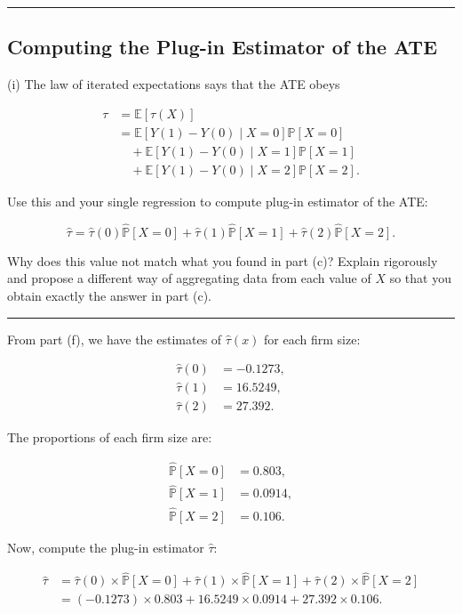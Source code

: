 \documentclass{article}
\newenvironment{colorparagraph}[1]{\par\color{#1}}{\par}
\begin{document}
\begin{colorparagraph}{questioncolor}
\rule{\textwidth}{0.5pt}

\label{q3i}\subsection{Computing the Plug-in Estimator of the ATE}
(i) The law of iterated expectations says that the ATE obeys

\begin{align*}
    \tau &= \mathbb{E}[\tau(X)] \\
    & = \mathbb{E}[Y(1) - Y(0) \mid X = 0]\mathbb{P}[X = 0] \\
    &\quad + \mathbb{E}[Y(1) - Y(0) \mid X = 1]\mathbb{P}[X = 1] \\
    &\quad + \mathbb{E}[Y(1) - Y(0) \mid X = 2]\mathbb{P}[X = 2].
\end{align*}

Use this and your single regression to compute plug-in estimator of the ATE:

\[
\hat{\tau} = \hat{\tau}(0)\hat{\mathbb{P}}[X = 0] + \hat{\tau}(1)\hat{\mathbb{P}}[X = 1] + \hat{\tau}(2)\hat{\mathbb{P}}[X = 2].
\]

Why does this value not match what you found in part (c)? Explain rigorously and propose a different way of aggregating data from each value of \( X \) so that you obtain exactly the answer in part (c).

\rule{\textwidth}{0.5pt}
\end{colorparagraph}

From part (f), we have the estimates of \(\hat{\tau}(x)\) for each firm size:

\[
\begin{aligned}
\hat{\tau}(0) &= -0.1273, \\
\hat{\tau}(1) &= 16.5249, \\
\hat{\tau}(2) &= 27.392.
\end{aligned}
\]

The proportions of each firm size are:

\[
\begin{aligned}
\hat{\mathbb{P}}[X = 0] &= 0.803, \\
\hat{\mathbb{P}}[X = 1] &= 0.0914, \\
\hat{\mathbb{P}}[X = 2] &= 0.106.
\end{aligned}
\]

Now, compute the plug-in estimator \(\hat{\tau}\):

\[
\begin{aligned}
\hat{\tau} &= \hat{\tau}(0) \times \hat{\mathbb{P}}[X = 0] + \hat{\tau}(1) \times \hat{\mathbb{P}}[X = 1] + \hat{\tau}(2) \times \hat{\mathbb{P}}[X = 2] \\
&= (-0.1273) \times 0.803 + 16.5249 \times 0.0914 + 27.392 \times 0.106.
\end{aligned}
\]
\end{document}
